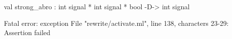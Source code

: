 \chklistingfalse
{}
\begin{ChkListingMsg}
val strong_abro : int signal * int signal * bool -D-> int signal
\end{ChkListingMsg}
\begin{ChkListingErr}
Fatal error: exception File "rewrite/activate.ml", line 138, characters 23-29: Assertion failed
\end{ChkListingErr}
